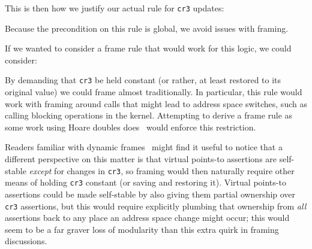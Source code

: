 \documentclass[acmsmall,screen,nonacm]{acmart}
\begin{document}
This is then how we justify our actual rule for \lstinline|cr3| updates:
\begin{mathpar}
\end{mathpar}
Because the precondition on this rule is global, we avoid issues with framing.

If we wanted to consider a frame rule that would work for this logic, we could consider:
\begin{mathpar}
\end{mathpar}
By demanding that \lstinline|cr3| be held constant (or rather, at least restored to its original value) we could frame almost traditionally. In particular, this rule would work with framing around calls that might lead to address space switches, such as calling blocking operations in the kernel.
Attempting to derive a frame rule as some work using Hoare doubles does~\cite{Chlipala2013Bedrock}
would enforce this restriction.

Readers familiar with dynamic frames~\cite{parkinson2011relationship} might find it useful to notice that a different perspective on this matter is that virtual points-to assertions are self-stable \emph{except} for changes in \lstinline|cr3|, so framing would then naturally require other means of holding \lstinline|cr3| constant (or saving and restoring it).
Virtual points-to assertions could be made self-stable by also giving them partial ownership over \lstinline|cr3| assertions, but this would require explicitly plumbing that ownership from \emph{all} assertions back to any place an address space change might occur; this would seem to be a far graver loss of modularity than this extra quirk in framing discussions.
\end{document}
